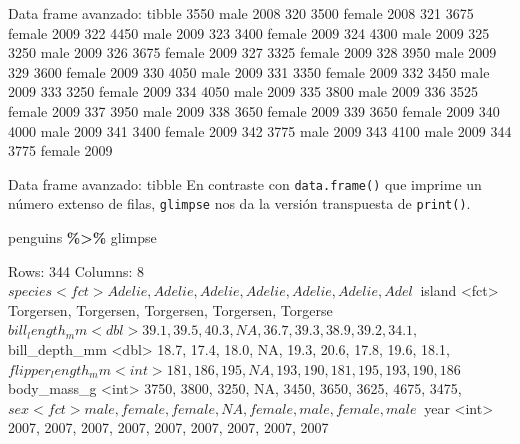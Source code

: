 \documentclass[
  ignorenonframetext,
  aspectratio=169]{beamer}
\newenvironment{Shaded}{\begin{snugshade}}{\end{snugshade}}
\newcommand{\NormalTok}[1]{#1}
\newcommand{\SpecialCharTok}[1]{\textcolor[rgb]{0.81,0.36,0.00}{\textbf{#1}}}
\let\oldverbatim\verbatim
\let\endoldverbatim\endverbatim
\renewenvironment{verbatim}{\tiny\oldverbatim}{\endoldverbatim}
\begin{document}
\begin{frame}[fragile]{Data frame avanzado: tibble}
\begin{verbatim}
319        3550   male 2008
320        3500 female 2008
321        3675 female 2009
322        4450   male 2009
323        3400 female 2009
324        4300   male 2009
325        3250   male 2009
326        3675 female 2009
327        3325 female 2009
328        3950   male 2009
329        3600 female 2009
330        4050   male 2009
331        3350 female 2009
332        3450   male 2009
333        3250 female 2009
334        4050   male 2009
335        3800   male 2009
336        3525 female 2009
337        3950   male 2009
338        3650 female 2009
339        3650 female 2009
340        4000   male 2009
341        3400 female 2009
342        3775   male 2009
343        4100   male 2009
344        3775 female 2009
\end{verbatim}
\end{frame}

\begin{frame}[fragile]{Data frame avanzado: tibble}
\label{data-frame-avanzado-tibble-7}
En contraste con \texttt{data.frame()} que imprime un número extenso de
filas, \texttt{glimpse} nos da la versión transpuesta de
\texttt{print()}.

\begin{Shaded}
\begin{Highlighting}[]
\NormalTok{penguins }\SpecialCharTok{\%\textgreater{}\%}\NormalTok{ glimpse}
\end{Highlighting}
\end{Shaded}

\begin{verbatim}
Rows: 344
Columns: 8
$ species           <fct> Adelie, Adelie, Adelie, Adelie, Adelie, Adelie, Adel~
$ island            <fct> Torgersen, Torgersen, Torgersen, Torgersen, Torgerse~
$ bill_length_mm    <dbl> 39.1, 39.5, 40.3, NA, 36.7, 39.3, 38.9, 39.2, 34.1, ~
$ bill_depth_mm     <dbl> 18.7, 17.4, 18.0, NA, 19.3, 20.6, 17.8, 19.6, 18.1, ~
$ flipper_length_mm <int> 181, 186, 195, NA, 193, 190, 181, 195, 193, 190, 186~
$ body_mass_g       <int> 3750, 3800, 3250, NA, 3450, 3650, 3625, 4675, 3475, ~
$ sex               <fct> male, female, female, NA, female, male, female, male~
$ year              <int> 2007, 2007, 2007, 2007, 2007, 2007, 2007, 2007, 2007~
\end{verbatim}
\end{frame}
\end{document}
